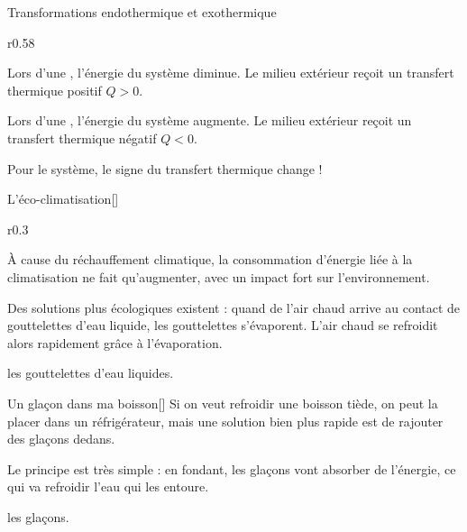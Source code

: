 \begin{doc}{Transformations endothermique et exothermique}
  \begin{wrapfigure}{r}{0.58\linewidth}
  \end{wrapfigure}
  \phantom{b}\vspace*{-20pt}
  
  \begin{importants}
    \pointCyan Lors d'une , l'énergie du système diminue. 
    Le milieu extérieur reçoit un transfert thermique positif $Q > 0$.
    \bigskip
    
    \pointCyan Lors d'une , l'énergie du système augmente.
    Le milieu extérieur reçoit un transfert thermique négatif $Q < 0$.
  \end{importants}

  \attention Pour le système, le signe du transfert thermique change !
\end{doc}


\begin{doc}{L'éco-climatisation}[\label{doc:climatisation}]
  \begin{wrapfigure}{r}{0.3\linewidth}
    \vspace*{-34pt}
    \centering
  \end{wrapfigure}
  À cause du réchauffement climatique, la consommation d'énergie liée à la climatisation ne fait qu'augmenter, avec un impact fort sur l'environnement.
  
  Des solutions plus écologiques existent : quand de l'air chaud arrive au contact de gouttelettes d'eau liquide, les gouttelettes s'évaporent.
  L'air chaud se refroidit alors rapidement grâce à l'évaporation.

   les gouttelettes d'eau liquides.
\end{doc}

\begin{doc}{Un glaçon dans ma boisson}[\label{doc:glacons}]
  Si on veut refroidir une boisson tiède, on peut la placer dans un réfrigérateur, mais une solution bien plus rapide est de rajouter des glaçons dedans.
  
  Le principe est très simple : en fondant, les glaçons vont absorber de l'énergie, ce qui va refroidir l'eau qui les entoure.

   les glaçons.
\end{doc}


